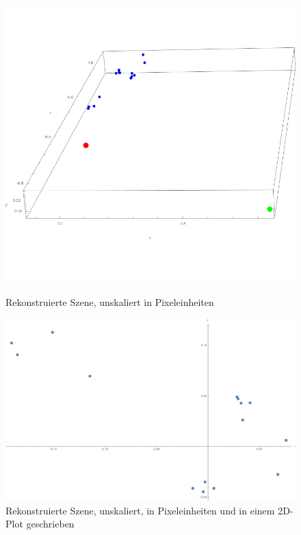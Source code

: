 \begin{figure}[!htb]
	\includegraphics[width=\linewidth]{images/reconstructed_Points_Same_Resolutions.png}
	\caption{Rekonstruierte Szene, unskaliert in Pixeleinheiten}
	\label{fig:awesome_image1}
	\endminipage\hfill
	\includegraphics[width=\linewidth]{images/reconstructed_Points_Same_Resolutions2D.png}
	\caption{Rekonstruierte Szene, unskaliert, in Pixeleinheiten und in einem 2D-Plot geschrieben}
	\label{fig:awesome_image2}
	\endminipage\hfill
\end{figure}





